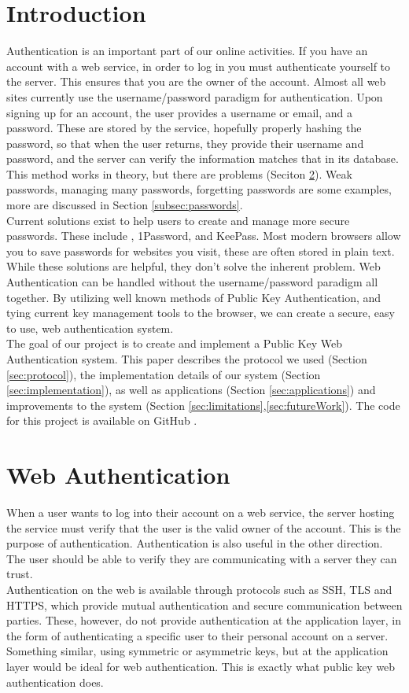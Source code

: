 \documentclass[11pt]{article}
\begin{document}
\section{Introduction} \label{sec:intro}
Authentication is an important part of our online activities. If you have an account with a web service, in order to log in you must authenticate yourself to the server. This ensures that you are the owner of the account. Almost all web sites currently use the username/password paradigm for authentication. Upon signing up for an account, the user provides a username or email, and a password. These are stored by the service, hopefully properly hashing the password, so that when the user returns, they provide their username and password, and the server can verify the information matches that in its database. This method works in theory, but there are problems (Seciton \ref{sec:webauth}). Weak passwords, managing many passwords, forgetting passwords are some examples, more are discussed in Section \ref{subsec:passwords}.\\
Current solutions exist to help users to create and manage more secure passwords. These include , 1Password, and KeePass. Most modern browsers allow you to save passwords for websites you visit, these are often stored in plain text. While these solutions are helpful, they don't solve the inherent problem. Web Authentication can be handled without the username/password paradigm all together. By utilizing well known methods of Public Key Authentication, and tying current key management tools to the browser, we can create a secure, easy to use, web authentication system.\\
The goal of our project is to create and implement a Public Key Web Authentication system. This paper describes the protocol we used (Section \ref{sec:protocol}), the implementation details of our system (Section \ref{sec:implementation}), as well as applications (Section \ref{sec:applications}) and improvements to the system (Section \ref{sec:limitations},\ref{sec:futureWork}). The code for this project is available on GitHub \cite{526proj}. 


\section{Web Authentication} \label{sec:webauth}
When a user wants to log into their account on a web service, the server hosting the service must verify that the user is the valid owner of the account. This is the purpose of authentication. Authentication is also useful in the other direction. The user should be able to verify they are communicating with a server they can trust.\\
Authentication on the web is available through protocols such as SSH, TLS and HTTPS, which provide mutual authentication and secure communication between parties. These, however, do not provide authentication at the application layer, in the form of authenticating a specific user to their personal account on a server. Something similar, using symmetric or asymmetric keys, but at the application layer would be ideal for web authentication. This is exactly what public key web authentication does.  
\end{document}
